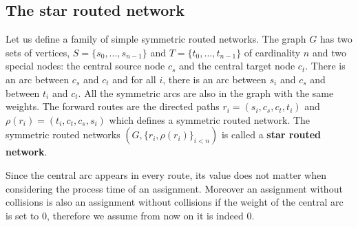 \documentclass[10pt, conference, letterpaper]{IEEEtran}
\begin{document}
   
    
    \subsection{The star routed network}
    
      Let us define a family of simple symmetric routed networks. 
      The graph $G$ has two sets of vertices, $S=\{s_0,...,s_{n-1}\}$ and $T=\{t_0,...,t_{n-1}\}$ of cardinality $n$ and two special nodes:
      the central source node {\bf $c_s$} and the central target node {\bf $c_t$}.
      There is an arc between {\bf $c_s$} and {\bf $c_t$} and for all $i$, there is an arc between $s_i$ and $c_s$ and between $t_i$ and $c_t$.
      All the symmetric arcs are also in the graph with the same weights.
      The forward routes are the directed paths $r_i = (s_i,c_s,c_t,t_i)$ and $\rho(r_i) = (t_i,c_t,c_s,s_i)$ which defines a symmetric routed network. 
      The symmetric routed networks $(G, \{r_i,\rho(r_i)\}_{i<n})$ is called a \textbf{star routed network}.
      
       \begin{center}

  \end{center}
	
      Since the central arc appears in every route, its value does not matter when considering the process time of an assignment.
      Moreover an assignment without collisions is also an assignment without collisions if the weight of the central arc 
      is set to $0$, therefore we assume from now on it is indeed $0$.
      
\end{document}
